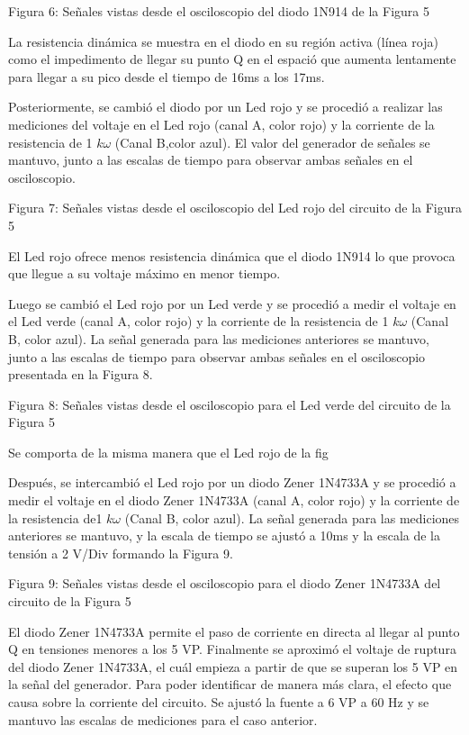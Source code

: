 \documentclass[journal]{IEEEtran}
\begin{document}
Figura 6: Señales vistas desde el osciloscopio del diodo 1N914 de la Figura 5


La resistencia dinámica se muestra en el diodo en su región activa (línea roja) como el impedimento de llegar su punto Q en el espació que aumenta lentamente para llegar a su pico desde el tiempo de 16ms a los
17ms.


Posteriormente, se cambió el diodo por un Led rojo y se procedió a realizar las mediciones del voltaje en el Led rojo (canal A, color rojo) y la corriente de la resistencia de 1 $k\omega$ (Canal B,color azul). El valor del generador de señales se mantuvo, junto a las escalas de tiempo para observar ambas señales en el osciloscopio.


Figura 7: Señales vistas desde el osciloscopio del Led rojo del circuito de la Figura 5


 El Led rojo ofrece menos resistencia dinámica que el diodo 1N914 lo que provoca que llegue a su voltaje máximo en menor tiempo.


Luego se cambió el Led rojo por un Led verde y se procedió a medir el voltaje en el Led verde (canal A, color rojo) y la corriente de la resistencia de 1 $k\omega$ (Canal B, color azul). La señal generada para las mediciones anteriores se mantuvo, junto a las escalas de tiempo para observar ambas señales en el osciloscopio presentada en la Figura 8.


Figura 8: Señales vistas desde el osciloscopio para el Led verde del circuito de la Figura 5



Se comporta de la misma manera que el Led rojo de la fig



Después, se intercambió el Led rojo por un diodo Zener 1N4733A y se procedió a medir el voltaje en el diodo Zener 1N4733A (canal A, color rojo) y la corriente de la resistencia de1 $k\omega$ (Canal B, color azul). La señal generada para las mediciones anteriores se mantuvo, y la escala de tiempo se ajustó a 10ms y la escala de la tensión a 2 V/Div formando la Figura 9.



Figura 9: Señales vistas desde el osciloscopio para el diodo Zener 1N4733A del circuito de la Figura 5



 El diodo Zener 1N4733A permite el paso de corriente en directa al llegar al punto Q en tensiones menores a los 5 VP. Finalmente se aproximó el voltaje de ruptura del diodo Zener 1N4733A, el cuál empieza a partir de que se superan los 5 VP en la señal del generador. Para poder identificar de manera más clara, el efecto que causa sobre la corriente del circuito. Se ajustó la fuente a 6 VP a 60 Hz y se mantuvo las escalas de
mediciones para el caso anterior.
\end{document}

